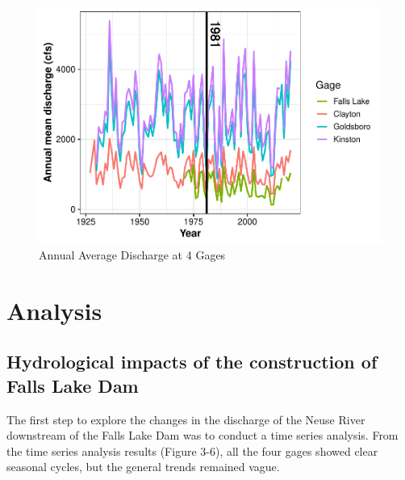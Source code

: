\documentclass[
  12pt,
]{article}
\begin{document}
\begin{figure}

\includegraphics{Gardner_Zeng_pdf_output_files/figure-latex/Plot annual mean discharge-1} \hfill{}

\caption{Annual Average Discharge at 4 Gages}\label{fig:Plot annual mean discharge}
\end{figure}

\hypertarget{analysis}{%
\section{Analysis}\label{analysis}}

\hypertarget{hydrological-impacts-of-the-construction-of-falls-lake-dam}{%
\subsection{Hydrological impacts of the construction of Falls Lake
Dam}\label{hydrological-impacts-of-the-construction-of-falls-lake-dam}}

The first step to explore the changes in the discharge of the Neuse
River downstream of the Falls Lake Dam was to conduct a time series
analysis. From the time series analysis results (Figure 3-6), all the
four gages showed clear seasonal cycles, but the general trends remained
vague.
\end{document}
